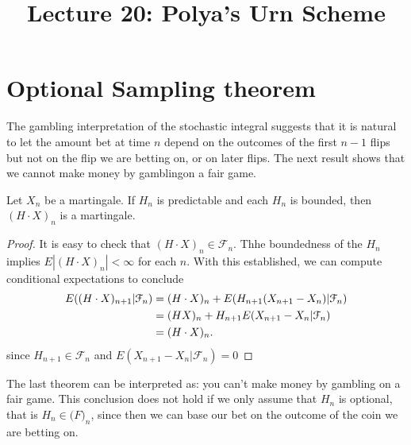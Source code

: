 \documentclass[a4paper,english,10pt]{article}
\title{Lecture 20: Polya's Urn Scheme}
\author{}
\begin{document}
\maketitle
\section{Optional Sampling theorem}
The gambling interpretation of the stochastic integral suggests that it is natural to let the amount bet at time $n$ depend on the outcomes of the first $n-1$ flips but not on the flip we are betting on, or on later flips. The next result shows that we cannot make money by gamblingon a fair game.

\begin{thm}Let $X_n$ be a martingale. If $H_n$ is predictable and each $H_n$ is bounded, then $(H\cdot X)_n$ is a martingale.
\end{thm}
\begin{proof} It is easy to check that $(H\cdot X)_n \in \mathcal{F}_n$. Thhe boundedness of the $H_n$ implies $E|(H\cdot X)_n|<\infty$ for each $n$. With this established, we can compute conditional expectations to conclude
\begin{align*}
E((H\cdot X)_{n+1}| \mathcal{F}_n)&=(H\cdot X)_n+E(H_{n+1}(X_{n+1}-X_n)| \mathcal{F}_n)\\
       &=(HX)_n+H_{n+1}E(X_{n+1}-X_n| \mathcal{F}_n)\\
       &=(H\cdot X)_n.\qedhere
\end{align*}
since $H_{n+1}\in \mathcal{F}_n$ and $E(X_{n+1}-X_n| \mathcal{F}_n)=0$
\end{proof}
The last theorem can be interpreted as: you can't make money by gambling on a fair game. This conclusion does not hold if we only assume that $H_n$ is optional, that is $H_n\in \mathcal(F)_n$, since then we can base our bet on the outcome of the coin we are betting on.
\end{document}
